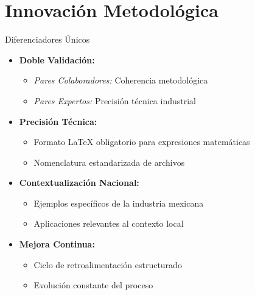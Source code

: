 \documentclass[10pt,aspectratio=169]{beamer}
\begin{document}

\section{Innovación Metodológica}

\begin{frame}{Diferenciadores Únicos}
	\begin{itemize}
		\item \textbf{Doble Validación:}
		\begin{itemize}
			\item \textit{Pares Colaboradores:} Coherencia metodológica
			\item \textit{Pares Expertos:} Precisión técnica industrial
		\end{itemize}
		
		\vspace{0.3cm}
		
		\item \textbf{Precisión Técnica:}
		\begin{itemize}
			\item Formato LaTeX obligatorio para expresiones matemáticas
			\item Nomenclatura estandarizada de archivos
		\end{itemize}
		
		\vspace{0.3cm}
		
		\item \textbf{Contextualización Nacional:}
		\begin{itemize}
			\item Ejemplos específicos de la industria mexicana
			\item Aplicaciones relevantes al contexto local
		\end{itemize}
		
		\vspace{0.3cm}
		
		\item \textbf{Mejora Continua:}
		\begin{itemize}
			\item Ciclo de retroalimentación estructurado
			\item Evolución constante del proceso
		\end{itemize}
	\end{itemize}
\end{frame}
\end{document}
